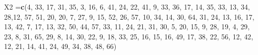 \documentclass[
]{book}
\newenvironment{Shaded}{\begin{snugshade}}{\end{snugshade}}
\newcommand{\DecValTok}[1]{\textcolor[rgb]{0.00,0.00,0.81}{#1}}
\newcommand{\FunctionTok}[1]{\textcolor[rgb]{0.13,0.29,0.53}{\textbf{#1}}}
\newcommand{\NormalTok}[1]{#1}
\newcommand{\OtherTok}[1]{\textcolor[rgb]{0.56,0.35,0.01}{#1}}
\begin{document}
\begin{Shaded}
\begin{Highlighting}[]
\NormalTok{X2 }\OtherTok{=}\FunctionTok{c}\NormalTok{(}\DecValTok{4}\NormalTok{, }\DecValTok{33}\NormalTok{, }\DecValTok{17}\NormalTok{, }\DecValTok{31}\NormalTok{, }\DecValTok{35}\NormalTok{, }\DecValTok{3}\NormalTok{, }\DecValTok{16}\NormalTok{, }\DecValTok{6}\NormalTok{, }\DecValTok{41}\NormalTok{, }\DecValTok{24}\NormalTok{, }\DecValTok{22}\NormalTok{, }\DecValTok{41}\NormalTok{, }\DecValTok{9}\NormalTok{, }\DecValTok{33}\NormalTok{, }\DecValTok{36}\NormalTok{, }\DecValTok{17}\NormalTok{, }\DecValTok{14}\NormalTok{, }\DecValTok{35}\NormalTok{, }\DecValTok{33}\NormalTok{, }
      \DecValTok{13}\NormalTok{, }\DecValTok{34}\NormalTok{, }\DecValTok{28}\NormalTok{,}\DecValTok{12}\NormalTok{, }\DecValTok{57}\NormalTok{, }\DecValTok{51}\NormalTok{, }\DecValTok{20}\NormalTok{, }\DecValTok{20}\NormalTok{, }\DecValTok{7}\NormalTok{, }\DecValTok{27}\NormalTok{, }\DecValTok{9}\NormalTok{, }\DecValTok{15}\NormalTok{, }\DecValTok{52}\NormalTok{, }\DecValTok{26}\NormalTok{, }\DecValTok{57}\NormalTok{, }\DecValTok{10}\NormalTok{, }\DecValTok{34}\NormalTok{, }\DecValTok{14}\NormalTok{, }\DecValTok{30}\NormalTok{, }
      \DecValTok{64}\NormalTok{, }\DecValTok{31}\NormalTok{, }\DecValTok{24}\NormalTok{, }\DecValTok{13}\NormalTok{, }\DecValTok{16}\NormalTok{, }\DecValTok{17}\NormalTok{, }\DecValTok{13}\NormalTok{, }\DecValTok{42}\NormalTok{, }\DecValTok{7}\NormalTok{, }\DecValTok{17}\NormalTok{, }\DecValTok{13}\NormalTok{, }\DecValTok{32}\NormalTok{, }\DecValTok{50}\NormalTok{, }\DecValTok{44}\NormalTok{, }\DecValTok{57}\NormalTok{, }\DecValTok{33}\NormalTok{, }\DecValTok{11}\NormalTok{, }\DecValTok{24}\NormalTok{, }
      \DecValTok{21}\NormalTok{, }\DecValTok{31}\NormalTok{, }\DecValTok{30}\NormalTok{, }\DecValTok{5}\NormalTok{, }\DecValTok{20}\NormalTok{, }\DecValTok{15}\NormalTok{, }\DecValTok{9}\NormalTok{, }\DecValTok{28}\NormalTok{, }\DecValTok{19}\NormalTok{, }\DecValTok{4}\NormalTok{, }\DecValTok{29}\NormalTok{, }\DecValTok{23}\NormalTok{, }\DecValTok{8}\NormalTok{, }\DecValTok{31}\NormalTok{, }\DecValTok{65}\NormalTok{, }\DecValTok{29}\NormalTok{, }\DecValTok{8}\NormalTok{, }\DecValTok{14}\NormalTok{, }\DecValTok{30}\NormalTok{, }
      \DecValTok{22}\NormalTok{, }\DecValTok{9}\NormalTok{, }\DecValTok{18}\NormalTok{, }\DecValTok{33}\NormalTok{, }\DecValTok{25}\NormalTok{, }\DecValTok{16}\NormalTok{, }\DecValTok{15}\NormalTok{, }\DecValTok{16}\NormalTok{, }\DecValTok{49}\NormalTok{, }\DecValTok{17}\NormalTok{, }\DecValTok{38}\NormalTok{, }\DecValTok{22}\NormalTok{, }\DecValTok{56}\NormalTok{, }\DecValTok{12}\NormalTok{, }\DecValTok{42}\NormalTok{, }\DecValTok{12}\NormalTok{, }\DecValTok{21}\NormalTok{, }\DecValTok{14}\NormalTok{, }
      \DecValTok{41}\NormalTok{, }\DecValTok{24}\NormalTok{, }\DecValTok{49}\NormalTok{, }\DecValTok{34}\NormalTok{, }\DecValTok{38}\NormalTok{, }\DecValTok{48}\NormalTok{, }\DecValTok{66}\NormalTok{)}


\end{Highlighting}
\end{Shaded}
\end{document}
